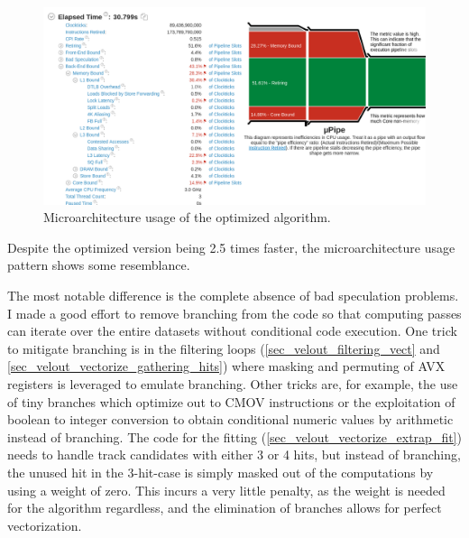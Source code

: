 \documentclass[12pt]{article}
\begin{document}
\begin{figure}[H]
	\begin{center}
		\includegraphics[width=\textwidth]{velout_uarch_overall_opt}
	\end{center}
	\caption{Microarchitecture usage of the optimized algorithm.}
	\label{fig_velout_uarch_overall_opt}
\end{figure}

Despite the optimized version being 2.5 times faster, the microarchitecture usage pattern shows some resemblance.

The most notable difference is the complete absence of bad speculation problems. I made a good effort to remove branching from the code so that computing passes can iterate over the entire datasets without conditional code execution. One trick to mitigate branching is in the filtering loops (\ref{sec_velout_filtering_vect} and \ref{sec_velout_vectorize_gathering_hits}) where masking and permuting of AVX registers is leveraged to emulate branching. Other tricks are, for example, the use of tiny branches which optimize out to CMOV instructions or the exploitation of boolean to integer conversion to obtain conditional numeric values by arithmetic instead of branching. The code for the fitting (\ref{sec_velout_vectorize_extrap_fit}) needs to handle track candidates with either 3 or 4 hits, but instead of branching, the unused hit in the 3-hit-case is simply masked out of the computations by using a weight of zero. This incurs a very little penalty, as the weight is needed for the algorithm regardless, and the elimination of branches allows for perfect vectorization.

\vspace{1pc}
\end{document}
